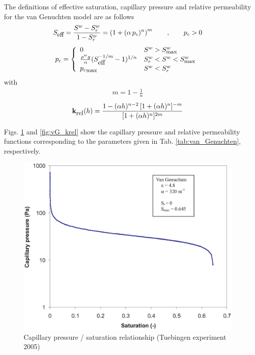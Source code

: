 The definitions of effective saturation, capillary pressure and relative permeability for the van Genuchten model are as follows
%
\begin{eqnarray}
S_{\mbox{\small eff}} = \frac{S^w - S_r^w}{1 -
S_r^w} = \left( 1 + (\alpha \, p_c)^n
\right)^m \qquad , \qquad p_c > 0
\end{eqnarray}
%
\begin{eqnarray}
p_c = \left\{
\begin{array}{ll}
0 & S^w >
S^w_{\mbox{\footnotesize max}}
\\
\frac{\rho^w g}{\alpha} (S_{\mbox{eff}}^{-1/m}-1)^{1/n} &
S_r^w < S^w <
S^w_{\mbox{\footnotesize max}}
\\
{p_c}_{\mbox{\footnotesize max}} & S^w <
S_r^w
\end{array}
\right.
\end{eqnarray}
%
with
\begin{eqnarray}
m = 1 - \frac{1}{n}
\end{eqnarray}
%
\begin{eqnarray}
\mathbf{k}_{\mbox{\small rel}}(h) 
= 
\frac{1-(\alpha h)^{n-2}\,[1+(\alpha h)^n]^{-m}}{[1+(\alpha h)^n]^{2m}}
\end{eqnarray}

Figs. \ref{fig:VanGenuhetenParameter} and \ref{fig:vG_krel} show the capillary pressure and relative permeability functions corresponding to the parameters given in Tab. \ref{tab:van_Genuchten}, respectively.

\begin{figure}[htb!]
\begin{center}
\includegraphics[width=0.7\columnwidth]{figures/VanGenuheten_P.eps}
\caption{Capillary pressure / saturation relationship (Tuebingen experiment
2005)} \label{fig:VanGenuhetenParameter}
\end{center}
\end{figure}
%

